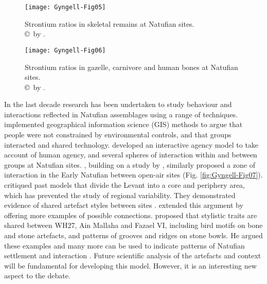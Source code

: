 \documentclass[%
	]{ijsra}
\begin{document}
\begin{figure}[!htb] %
\texttt{[image: Gyngell-Fig05]}
\caption{Strontium ratios in skeletal remains at Natufian sites.
        {\normalfont\scriptsize \\ \copyright\ by 
 \textcite{Shewan_2004}.
                  }}
\label{fig:Gyngell-Fig05}
\end{figure}

\begin{figure}[!htb] %
\texttt{[image: Gyngell-Fig06]}
\caption{Strontium ratios in gazelle, carnivore and human bones at Natufian sites.
        {\normalfont\scriptsize \\ \copyright\ by 
 \textcite{Shewan_2004}.
                  }}
\label{fig:Gyngell-Fig06}
\end{figure}


In the last decade research has been undertaken to study behaviour and interactions reflected in Natufian assemblages using a range of techniques. \textcite{Parslow_2009} implemented geographical information science (GIS) methods to argue that people were not constrained by environmental controls, and that groups interacted and shared technology. 
\textcite[3]{Parslow_2009} developed an interactive agency model to take account of human agency, and several spheres of interaction within and between groups at Natufian sites. 
\textcite{Edwards_2015}, building on a study by \textcite{Belfer-Cohen_2013}, similarly proposed a zone of interaction in the Early Natufian between open-air sites (Fig. \ref{fig:Gyngell-Fig07}). 
\textcite[547]{Belfer-Cohen_2013} critiqued past models that divide the Levant into a core and periphery area, which has prevented the study of regional variability. 
They demonstrated evidence of shared artefact styles between sites \textcite[546]{Belfer-Cohen_2013}. 
\textcite[272]{Edwards_2015} extended this argument by offering more examples of possible connections. 
\textcite[276]{Edwards_2015} proposed that stylistic traits are shared between WH27, Ain Mallaha and Fazael VI, including bird motifs on bone and stone artefacts, and patterns of grooves and ridges on stone bowls. 
He argued these examples and many more can be used to indicate patterns of Natufian settlement and interaction \parencite[280]{Edwards_2015}. Future scientific analysis of the artefacts and context will be fundamental for developing this model. However, it is an interesting new aspect to the debate.
\end{document}
